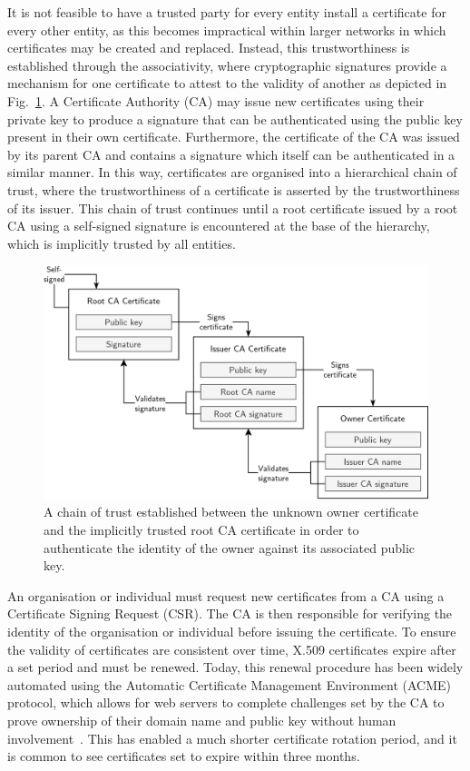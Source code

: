 It is not feasible to have a trusted party for every entity install a certificate for every other entity, as this becomes impractical within larger networks in which certificates may be created and replaced. Instead, this trustworthiness is established through the associativity, where cryptographic signatures provide a mechanism for one certificate to attest to the validity of another as depicted in Fig.~\ref{tls_chain_figure}. A Certificate Authority (CA) may issue new certificates using their private key to produce a signature that can be authenticated using the public key present in their own certificate. Furthermore, the certificate of the CA was issued by its parent CA and contains a signature which itself can be authenticated in a similar manner. In this way, certificates are organised into a hierarchical chain of trust, where the trustworthiness of a certificate is asserted by the trustworthiness of its issuer. This chain of trust continues until a root certificate issued by a root CA using a self-signed signature is encountered at the base of the hierarchy, which is implicitly trusted by all entities.

\begin{figure}[ht]
\centerline{\includegraphics[width=160mm]{images/tls-chain.png}}
\caption[TLS certificate chain of trust]{A chain of trust established between the unknown owner certificate and the implicitly trusted root CA certificate in order to authenticate the identity of the owner against its associated public key.}
\label{tls_chain_figure}
\end{figure}

An organisation or individual must request new certificates from a CA using a Certificate Signing Request (CSR). The CA is then responsible for verifying the identity of the organisation or individual before issuing the certificate. To ensure the validity of certificates are consistent over time, X.509 certificates expire after a set period and must be renewed. Today, this renewal procedure has been widely automated using the Automatic Certificate Management Environment (ACME) protocol, which allows for web servers to complete challenges set by the CA to prove ownership of their domain name and public key without human involvement~\cite{rfc8555}. This has enabled a much shorter certificate rotation period, and it is common to see certificates set to expire within three months.

